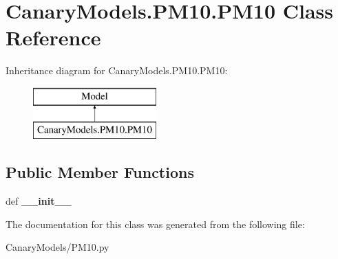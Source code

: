 \hypertarget{class_canary_models_1_1_p_m10_1_1_p_m10}{\section{Canary\-Models.\-P\-M10.\-P\-M10 Class Reference}
\label{class_canary_models_1_1_p_m10_1_1_p_m10}
}
Inheritance diagram for Canary\-Models.\-P\-M10.\-P\-M10\-:\begin{figure}[H]
\begin{center}
\leavevmode
\includegraphics[height=2.000000cm]{class_canary_models_1_1_p_m10_1_1_p_m10}
\end{center}
\end{figure}
\subsection*{Public Member Functions}
\begin{DoxyCompactItemize}
\item 
\hypertarget{class_canary_models_1_1_p_m10_1_1_p_m10_a97395a9f40ca5ba05911ee8672a2c9aa}{def {\bfseries \-\_\-\-\_\-init\-\_\-\-\_\-}}\label{class_canary_models_1_1_p_m10_1_1_p_m10_a97395a9f40ca5ba05911ee8672a2c9aa}

\end{DoxyCompactItemize}


The documentation for this class was generated from the following file\-:\begin{DoxyCompactItemize}
\item 
Canary\-Models/P\-M10.\-py\end{DoxyCompactItemize}
